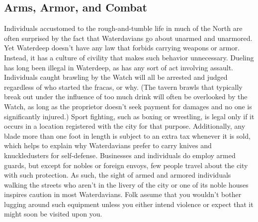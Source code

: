 \documentclass[10pt,a4paper,twoside,twocolumn,openany,nodeprecatedcode]{dndbook}
\begin{document}
\subsection{Arms, Armor, and Combat}
Individuals accustomed to the rough-and-tumble life in much of the North are often surprised by the fact that Waterdavians go about unarmed and unarmored. Yet Waterdeep doesn't have any law that forbids carrying weapons or armor. Instead, it has a culture of civility that makes such behavior unnecessary.
Dueling has long been illegal in Waterdeep, as has any sort of act involving assault. Individuals caught brawling by the Watch will all be arrested and judged regardless of who started the fracas, or why. (The tavern brawls that typically break out under the influence of too much drink will often be overlooked by the Watch, as long as the proprietor doesn't seek payment for damages and no one is significantly injured.) Sport fighting, such as boxing or wrestling, is legal only if it occurs in a location registered with the city for that purpose. Additionally, any blade more than one foot in length is subject to an extra tax whenever it is sold, which helps to explain why Waterdavians prefer to carry knives and knuckledusters for self-defense.
Businesses and individuals do employ armed guards, but except for nobles or foreign envoys, few people travel about the city with such protection. As such, the sight of armed and armored individuals walking the streets who aren't in the livery of the city or one of its noble houses inspires caution in most Waterdavians. Folk assume that you wouldn't bother lugging around such equipment unless you either intend violence or expect that it might soon be visited upon you.
\end{document}
